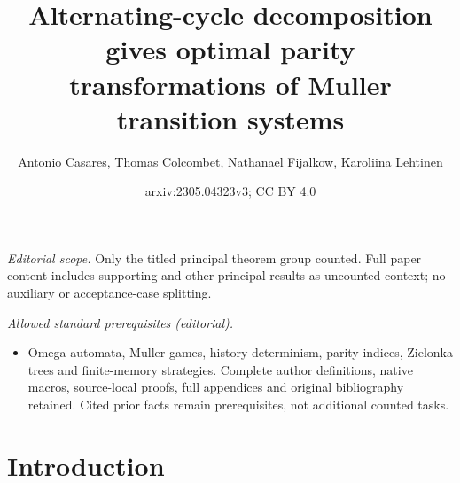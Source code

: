\documentclass[10pt,a4paper]{amsart}
\title{Alternating-cycle decomposition gives optimal parity transformations of Muller transition systems}
\author{Antonio Casares, Thomas Colcombet, Nathanael Fijalkow, Karoliina Lehtinen}
\date{arxiv:2305.04323v3; CC BY 4.0}
\begin{document}
\maketitle
\noindent\textit{Editorial scope.} Only the titled principal theorem group counted. Full paper content includes supporting and other principal results as uncounted context; no auxiliary or acceptance-case splitting.\par\medskip
\noindent\textit{Allowed standard prerequisites (editorial).}\begin{itemize}
\item Omega-automata, Muller games, history determinism, parity indices, Zielonka trees and finite-memory strategies. Complete author definitions, native macros, source-local proofs, full appendices and original bibliography retained. Cited prior facts remain prerequisites, not additional counted tasks.
\end{itemize}\medskip
	\section{Introduction}\label{section:introduction}
\end{document}
